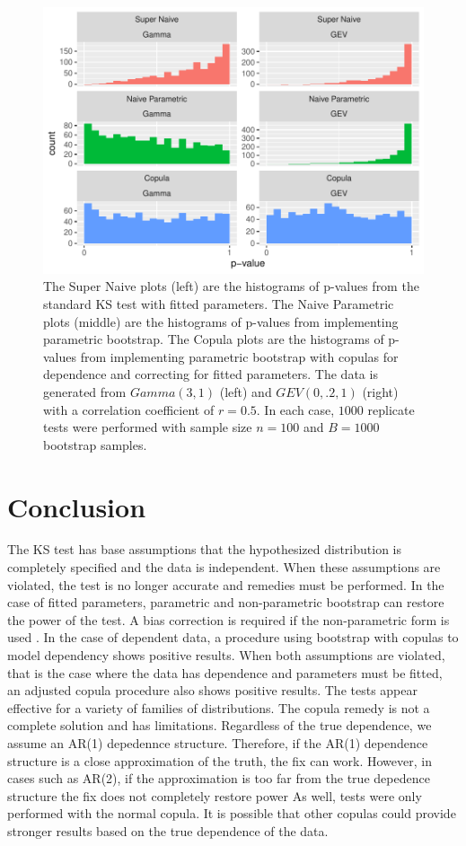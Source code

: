 \documentclass[12pt, letterpaper, titlepage]{article}
\begin{document}
\begin{figure}[tbp]
  \centering
  \includegraphics{hist_gamma_gev_FD}
  \caption{The Super Naive plots (left) are the histograms of p-values from the 
  standard KS test with fitted parameters. The Naive Parametric plots (middle) 
  are the histograms of p-values from implementing parametric bootstrap. The 
  Copula plots are the histograms of p-values from implementing parametric 
  bootstrap with copulas for dependence and correcting for fitted parameters. 
  The data is generated from $Gamma(3, 1)$ (left) and $GEV(0, .2, 1)$ (right) 
  with a correlation coefficient of $r = 0.5$. In each case, $1000$ replicate 
  tests were performed with sample size $n = 100$ and $B = 1000$ bootstrap 
  samples.}
  \label{fig:hist_gamma__gev_FD}
\end{figure}


\section{Conclusion}
\label{sec:conclusion}

The KS test has base assumptions that the hypothesized distribution is 
completely specified and the data is independent. When these assumptions are 
violated, the test is no longer accurate and remedies must be performed. In the 
case of fitted parameters, parametric and non-parametric bootstrap can restore 
the power of the test. A bias correction is required if the non-parametric form 
is used \citep{Babu}. In the case of dependent data, a procedure using bootstrap 
with copulas to model dependency shows positive results. When both assumptions 
are violated, that is the case where the data has dependence and parameters must 
be fitted, an adjusted copula procedure also shows positive results. The tests 
appear effective for a variety of families of distributions. The copula remedy 
is not a complete solution and has limitations. Regardless of the true 
dependence, we assume an AR(1) depedennce structure. Therefore, if the AR(1) 
dependence structure is a close approximation of the truth, the fix can work. 
However, in cases such as AR(2), if the approximation is too far from the true 
depedence structure the fix does not completely restore power As well, tests 
were only performed with the normal copula. It is possible that other copulas
could provide stronger results based on the true dependence of the data.




\end{document}
